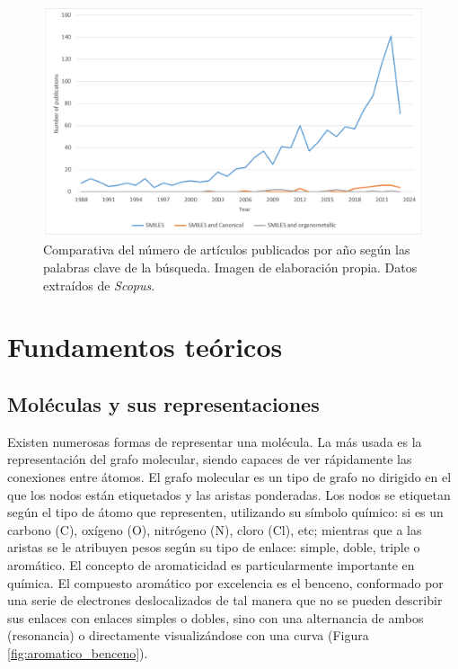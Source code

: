 \begin{figure}[h!]
        \centering
        \includegraphics[scale=0.5]{imagenes/estado_arte/revisionBibliografica.png}
        \caption{Comparativa del número de artículos publicados por año según las palabras clave de la búsqueda. Imagen de elaboración propia. Datos extraídos de \emph{Scopus}.}
        \label{fig:revisionBibliografica}
    \end{figure}


\section{Fundamentos teóricos}

\subsection{Moléculas y sus representaciones}

Existen numerosas formas de representar una molécula. La más usada es la representación del grafo molecular, siendo capaces de ver rápidamente las conexiones entre átomos. El grafo molecular es un tipo de grafo no dirigido en el que los nodos están etiquetados y las aristas ponderadas. Los nodos se etiquetan según el tipo de átomo que representen, utilizando su símbolo químico: si es un carbono (C), oxígeno (O), nitrógeno (N), cloro (Cl), etc; mientras que a las aristas se le atribuyen pesos según su tipo de enlace: simple, doble, triple o aromático. El concepto de aromaticidad es particularmente importante en química. El compuesto aromático por excelencia es el benceno, conformado por una serie de electrones deslocalizados de tal manera que no se pueden describir sus enlaces con enlaces simples o dobles, sino con una alternancia de ambos (resonancia) o directamente visualizándose con una curva (Figura \ref{fig:aromatico_benceno}).

